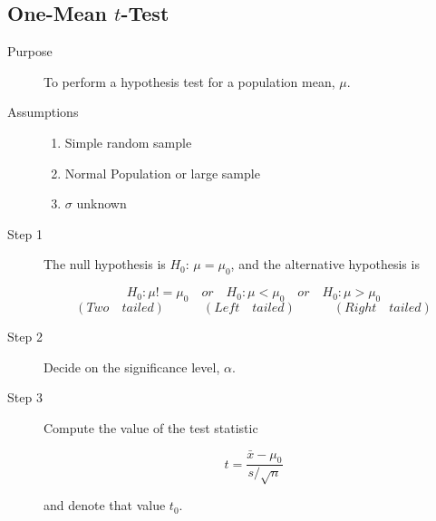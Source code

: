 \documentclass[12pt]{article}
\begin{document}
        \subsection*{One-Mean $t$-Test}
            \begin{description}
                \item[Purpose] To perform a hypothesis test for a population mean, $\mu$.
                \item[Assumptions]
                \begin{enumerate}
                    \item Simple random sample
                    \item Normal Population or large sample
                    \item $\sigma$ unknown 
                \end{enumerate} 
                \item[Step 1] The null hypothesis is $H_0$: $\mu = \mu_0$, and the
                alternative hypothesis is 
                \begin{center}
                    \[
                        H_0: \mu != \mu_0 \quad or \quad H_0: \mu < \mu_0 \quad or \quad
                        H_0: \mu > \mu_0    
                    \]
                    \[
                        (Two \quad tailed)\quad\quad\quad(Left \quad tailed)\quad\quad\quad
                        (Right \quad tailed)    
                    \]
                \end{center}
                \item[Step 2] Decide on the significance level, $\alpha$.
                \item[Step 3] Compute the value of the test statistic
                \begin{center}   
                    \[
                        t = \frac{\bar{x} - \mu_0}{s/\sqrt{n}}    
                    \]
                \end{center}
                and denote that value $t_0$.
            \end{description}
\end{document}
